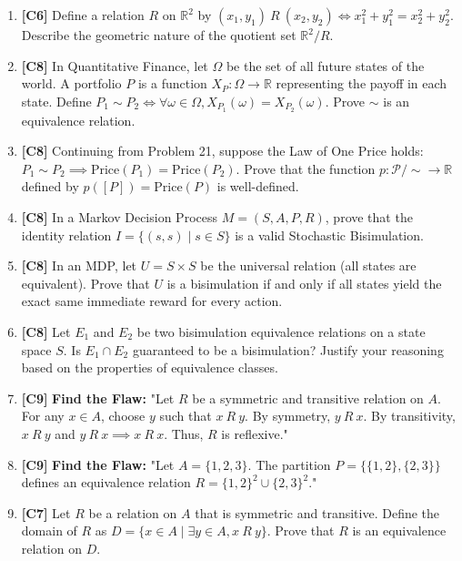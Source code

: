 \documentclass[11pt, a4paper]{article}
\theoremstyle{definition}
\theoremstyle{remark}
\newcommand{\R}{\mathbb{R}}
\begin{document}
\begin{enumerate}[label=\textbf{\arabic*.}, leftmargin=*]
    \item \textbf{[C6]} Define a relation $R$ on $\R^2$ by $(x_1, y_1) \ R \ (x_2, y_2) \iff x_1^2 + y_1^2 = x_2^2 + y_2^2$. Describe the geometric nature of the quotient set $\R^2/R$.
    
    \item \textbf{[C8]} In Quantitative Finance, let $\Omega$ be the set of all future states of the world. A portfolio $P$ is a function $X_P: \Omega \to \R$ representing the payoff in each state. Define $P_1 \sim P_2 \iff \forall \omega \in \Omega, X_{P_1}(\omega) = X_{P_2}(\omega)$. Prove $\sim$ is an equivalence relation.
    
    \item \textbf{[C8]} Continuing from Problem 21, suppose the Law of One Price holds: $P_1 \sim P_2 \implies \text{Price}(P_1) = \text{Price}(P_2)$. Prove that the function $p: \mathcal{P}/\sim \to \R$ defined by $p([P]) = \text{Price}(P)$ is well-defined.
    
    \item \textbf{[C8]} In a Markov Decision Process $M = (S, A, P, R)$, prove that the identity relation $I = \{(s, s) \mid s \in S\}$ is a valid Stochastic Bisimulation.
    
    \item \textbf{[C8]} In an MDP, let $U = S \times S$ be the universal relation (all states are equivalent). Prove that $U$ is a bisimulation if and only if all states yield the exact same immediate reward for every action.
    
    \item \textbf{[C8]} Let $E_1$ and $E_2$ be two bisimulation equivalence relations on a state space $S$. Is $E_1 \cap E_2$ guaranteed to be a bisimulation? Justify your reasoning based on the properties of equivalence classes.
    
    \item \textbf{[C9]} \textbf{Find the Flaw:} "Let $R$ be a symmetric and transitive relation on $A$. For any $x \in A$, choose $y$ such that $x \ R \ y$. By symmetry, $y \ R \ x$. By transitivity, $x \ R \ y$ and $y \ R \ x \implies x \ R \ x$. Thus, $R$ is reflexive."
    
    \item \textbf{[C9]} \textbf{Find the Flaw:} "Let $A = \{1, 2, 3\}$. The partition $P = \{\{1, 2\}, \{2, 3\}\}$ defines an equivalence relation $R = \{1, 2\}^2 \cup \{2, 3\}^2$."
    
    \item \textbf{[C7]} Let $R$ be a relation on $A$ that is symmetric and transitive. Define the domain of $R$ as $D = \{x \in A \mid \exists y \in A, x \ R \ y\}$. Prove that $R$ is an equivalence relation on $D$.
    

\end{enumerate}
\end{document}
